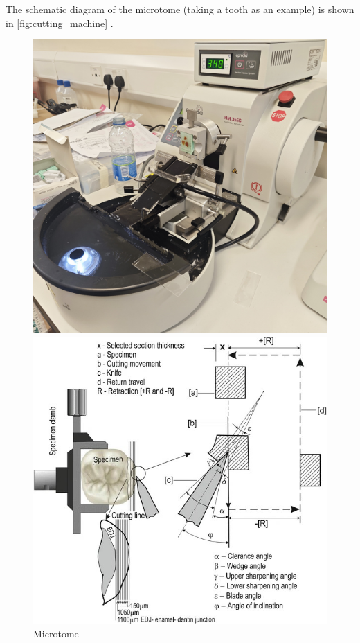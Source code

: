 
The schematic diagram of the microtome (taking a tooth as an example) is shown in \autoref{fig:cutting_machine} \cite{4.1}.

\begin{figure}[htbp]
    \centering
    \begin{minipage}{0.35\textwidth}
        \centering
        \includegraphics[width=\textwidth]{./fig/machine.jpg}
        \caption{Microtome}
        \label{fig:machine}
    \end{minipage}
    \begin{minipage}{0.35\textwidth}
        \centering
        \includegraphics[width=\textwidth]{./fig/10266_2018_353_Fig1_HTML.jpg}

\end{minipage}
\end{figure}
